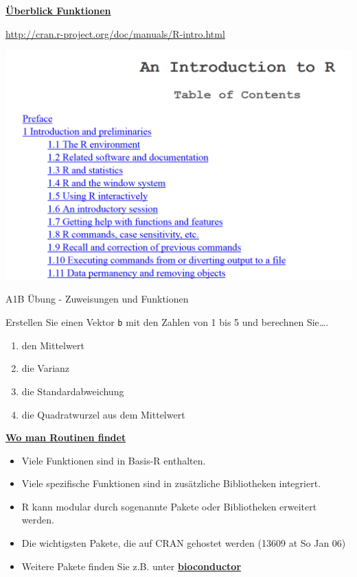 \documentclass[ignorenonframetext,]{beamer}
\providecommand{\tightlist}{%
  \setlength{\itemsep}{0pt}\setlength{\parskip}{0pt}}
\begin{document}
\begin{frame}{\href{http://cran.r-project.org/doc/manuals/R-intro.html}{\textbf{Überblick
Funktionen}}}
\protect\hypertarget{uberblick-funktionen}{}

\url{http://cran.r-project.org/doc/manuals/R-intro.html}

\includegraphics{figure/UebersichtBefehle.PNG}

\end{frame}

\begin{frame}[fragile]{A1B Übung - Zuweisungen und Funktionen}
\protect\hypertarget{a1b-ubung---zuweisungen-und-funktionen}{}

Erstellen Sie einen Vektor \texttt{b} mit den Zahlen von 1 bis 5 und
berechnen Sie\ldots{}.

\begin{enumerate}
\item
  den Mittelwert
\item
  die Varianz
\item
  die Standardabweichung
\item
  die Quadratwurzel aus dem Mittelwert
\end{enumerate}

\end{frame}

\begin{frame}{\href{https://stats.idre.ucla.edu/r/seminars/intro/}{\textbf{Wo
man Routinen findet}}}
\protect\hypertarget{wo-man-routinen-findet}{}

\begin{itemize}
\tightlist
\item
  Viele Funktionen sind in Basis-R enthalten.
\item
  Viele spezifische Funktionen sind in zusätzliche Bibliotheken
  integriert.
\item
  R kann modular durch sogenannte Pakete oder Bibliotheken erweitert
  werden.
\item
  Die wichtigsten Pakete, die auf CRAN gehostet werden (13609 at So Jan
  06)
\item
  Weitere Pakete finden Sie z.B. unter
  \href{www.bioconductor.org}{\textbf{bioconductor}}
\end{itemize}

\end{frame}
\end{document}
